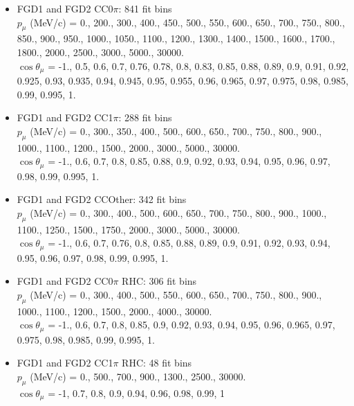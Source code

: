 \begin{itemize}
  \item FGD1 and FGD2 CC0$\pi$: 841 fit bins\\
    $p_\mu$ (MeV/c) = 0., 200., 300., 400., 450., 500., 550., 600., 650., 700., 750., 800., 850., 900., 950., 1000., 1050., 1100., 1200., 1300., 1400., 1500., 1600., 1700., 1800., 2000., 2500., 3000., 5000., 30000. \\
    $\cos\theta_\mu$ = -1., 0.5, 0.6, 0.7, 0.76, 0.78, 0.8, 0.83, 0.85, 0.88, 0.89, 0.9, 0.91, 0.92, 0.925, 0.93, 0.935, 0.94, 0.945, 0.95, 0.955, 0.96, 0.965, 0.97, 0.975, 0.98, 0.985, 0.99, 0.995, 1.\\

  \item FGD1 and FGD2 CC1$\pi$: 288 fit bins\\
    $p_\mu$ (MeV/c) = 0., 300., 350., 400., 500., 600., 650., 700., 750., 800., 900., 1000., 1100., 1200., 1500., 2000., 3000., 5000., 30000. \\
    $\cos\theta_\mu$ = -1., 0.6, 0.7, 0.8, 0.85, 0.88, 0.9, 0.92, 0.93, 0.94, 0.95, 0.96, 0.97, 0.98, 0.99, 0.995, 1. \\

  \item FGD1 and FGD2 CCOther: 342 fit bins\\
    $p_\mu$ (MeV/c) = 0., 300., 400., 500., 600., 650., 700., 750., 800., 900., 1000., 1100., 1250., 1500., 1750., 2000., 3000., 5000., 30000. \\
    $\cos\theta_\mu$ = -1., 0.6, 0.7, 0.76, 0.8, 0.85, 0.88, 0.89, 0.9, 0.91, 0.92, 0.93, 0.94, 0.95, 0.96, 0.97, 0.98, 0.99, 0.995, 1. \\

  \item FGD1 and FGD2 CC0$\pi$ RHC: 306 fit bins\\
    $p_\mu$ (MeV/c) = 0., 300., 400., 500., 550., 600., 650., 700., 750., 800., 900., 1000., 1100., 1200., 1500., 2000., 4000., 30000.\\
    $\cos\theta_\mu$ = -1., 0.6, 0.7, 0.8, 0.85, 0.9, 0.92, 0.93, 0.94, 0.95, 0.96, 0.965, 0.97, 0.975, 0.98, 0.985, 0.99, 0.995, 1.\\

  \item FGD1 and FGD2 CC1$\pi$ RHC: 48 fit bins \\
    $p_\mu$ (MeV/c) = 0., 500., 700., 900., 1300., 2500., 30000.\\
    $\cos\theta_\mu$ = -1, 0.7, 0.8, 0.9, 0.94, 0.96, 0.98, 0.99, 1\\


\end{itemize}
